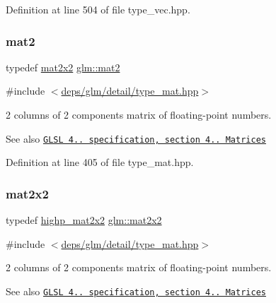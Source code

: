 Definition at line 504 of file type\+\_\+vec.\+hpp.

\mbox{\label{group__core__types_ga8357ec0aab6f8cf69313592492663c3f}} 
\subsubsection{\texorpdfstring{mat2}{mat2}}
{\footnotesize\ttfamily typedef \hyperlink{group__core__types_gaeddc14adb4963d9bad73866cc202fb40}{mat2x2} \hyperlink{group__core__types_ga8357ec0aab6f8cf69313592492663c3f}{glm\+::mat2}}



{\ttfamily \#include $<$\hyperlink{type__mat_8hpp}{deps/glm/detail/type\+\_\+mat.\+hpp}$>$}

2 columns of 2 components matrix of floating-\/point numbers.

\begin{DoxySeeAlso}{See also}
\href{http://www.opengl.org/registry/doc/GLSLangSpec.4.20.8.pdf}{\tt G\+L\+SL 4.. specification, section 4.. Matrices} 
\end{DoxySeeAlso}


Definition at line 405 of file type\+\_\+mat.\+hpp.

\mbox{\label{group__core__types_gaeddc14adb4963d9bad73866cc202fb40}} 
\subsubsection{\texorpdfstring{mat2x2}{mat2x2}}
{\footnotesize\ttfamily typedef \hyperlink{group__core__precision_gacdb012ddb9e783ed51b0ee009bf0d822}{highp\+\_\+mat2x2} \hyperlink{group__core__types_gaeddc14adb4963d9bad73866cc202fb40}{glm\+::mat2x2}}



{\ttfamily \#include $<$\hyperlink{type__mat_8hpp}{deps/glm/detail/type\+\_\+mat.\+hpp}$>$}

2 columns of 2 components matrix of floating-\/point numbers.

\begin{DoxySeeAlso}{See also}
\href{http://www.opengl.org/registry/doc/GLSLangSpec.4.20.8.pdf}{\tt G\+L\+SL 4.. specification, section 4.. Matrices} 
\end{DoxySeeAlso}


